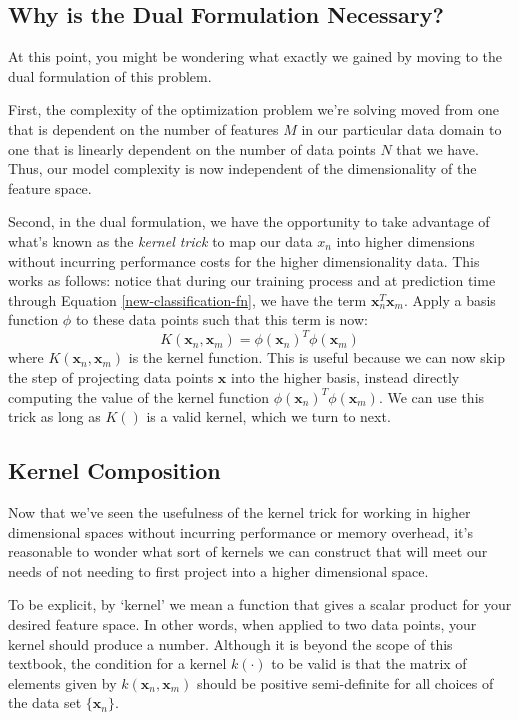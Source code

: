 \subsection{Why is the Dual Formulation Necessary?}
At this point, you might be wondering what exactly we gained by moving to the dual formulation of this problem.

First, the complexity of the optimization problem we're solving moved from one that is dependent on the number of features $M$ in our particular data domain to one that is linearly dependent on the number of data points $N$ that we have. Thus, our model complexity is now independent of the dimensionality of the feature space.

Second, in the dual formulation, we have the opportunity to take advantage of what's known as the \textit{kernel trick} to map our data $x_{n}$ into higher dimensions without incurring performance costs for the higher dimensionality data. This works as follows: notice that during our training process and at prediction time through Equation \ref{new-classification-fn}, we have the term $\textbf{x}_{n}^{T} \textbf{x}_{m}$. Apply a basis function $\phi$ to these data points such that this term is now:
\begin{equation} \label{kernel-fn}
	K(\textbf{x}_{n}, \textbf{x}_{m}) = \phi(\textbf{x}_{n})^{T} \phi(\textbf{x}_{m})
\end{equation}
where $K(\textbf{x}_{n}, \textbf{x}_{m})$ is the kernel function. This is useful because we can now skip the step of projecting data points $\textbf{x}$ into the higher basis, instead directly computing the value of the kernel function $\phi(\textbf{x}_{n})^{T} \phi(\textbf{x}_{m})$. We can use this trick as long as $K()$ is a valid kernel, which we turn to next.


\subsection{Kernel Composition}
Now that we've seen the usefulness of the kernel trick for working in higher dimensional spaces without incurring performance or memory overhead, it's reasonable to wonder what sort of kernels we can construct that will meet our needs of not needing to first project into a higher dimensional space.

To be explicit, by `kernel' we mean a function that gives a scalar product for your desired feature space. In other words, when applied to two data points, your kernel should produce a number. Although it is beyond the scope of this textbook, the condition for a kernel $k(\cdot)$ to be valid is that the matrix of elements given by $k(\textbf{x}_{n}, \textbf{x}_{m})$ should be positive semi-definite for all choices of the data set $\{ \textbf{x}_{n} \}$.

